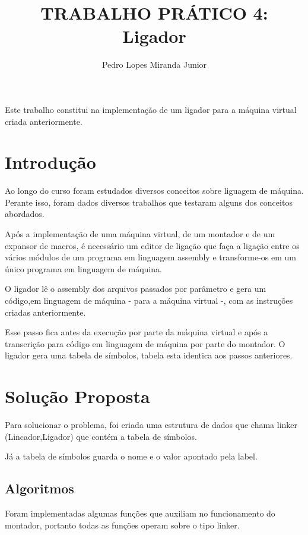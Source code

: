 \documentclass[12pt]{article}
\title{TRABALHO PRÁTICO 4: \\ Ligador}
\author{Pedro Lopes Miranda Junior}
\begin{document}
\maketitle

\begin{resumo} 
Este trabalho constitui na implementação de um ligador para a máquina virtual criada anteriormente.
\end{resumo}

\section{Introdução}
\label{introducao}
Ao longo do curso foram estudados diversos conceitos sobre liguagem de máquina.
Perante isso, foram dados diversos trabalhos que testaram alguns dos conceitos
abordados.

Após a implementação de uma máquina virtual, de um montador e de um expansor de
macros, é necessário um editor de ligação que faça a ligação entre os vários
módulos de um programa em linguagem assembly e transforme-os em um único
programa em linguagem de máquina.

O ligador lê o assembly dos arquivos passados por parâmetro e gera um
código,em linguagem de máquina - para a máquina virtual -, com as instruções
criadas anteriormente.

Esse passo fica antes da execução por parte da máquina virtual e após a
transcrição para código em linguagem de máquina por parte do montador.
O ligador gera uma tabela de símbolos, tabela esta identica aos passos
anteriores.

\section{Solução Proposta}
\label{solucao_proposta}
Para solucionar o problema, foi criada uma estrutura de dados que chama
linker (Lincador,Ligador) que contém a tabela de símbolos.

Já a tabela de símbolos guarda o nome e o valor apontado pela label.

\subsection{Algoritmos}

Foram implementadas algumas funções que auxiliam no funcionamento do montador, 
portanto todas as funções operam sobre o tipo linker.

\newpage
\end{document}
